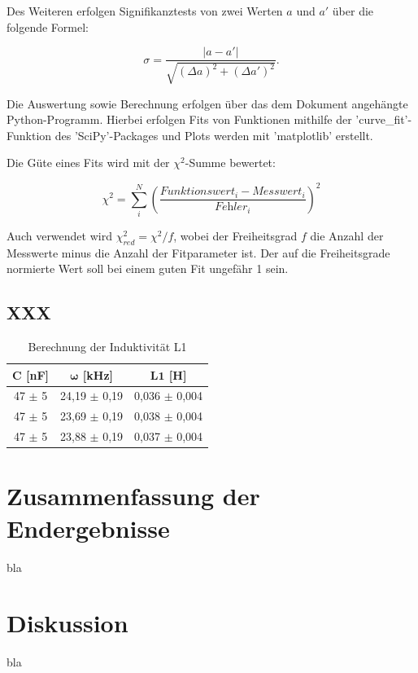 \documentclass{article}
\newcommand\invisiblesection[1]{%
  \refstepcounter{section}%
  \addcontentsline{toc}{section}{\protect\numberline{\thesection}#1}%
  \sectionmark{#1}\phantom{}}
\begin{document}
Des Weiteren erfolgen Signifikanztests von zwei Werten $a$ und $a'$ über die folgende Formel:

\begin{equation}
    \sigma = \frac{|a-a'|}{\sqrt{(\Delta a)^2 + (\Delta a')^2}}.
\end{equation}

Die Auswertung sowie Berechnung erfolgen über das dem Dokument angehängte Python-Programm. Hierbei erfolgen Fits von Funktionen mithilfe der 'curve\_fit'-Funktion des 'SciPy'-Packages und Plots werden mit 'matplotlib' erstellt.

Die Güte eines Fits wird mit der $\chi^2$-Summe bewertet:

\begin{equation}
    \chi^2 = \sum_i^N \left( \frac{\textit{Funktionswert}_i - \textit{Messwert}_i}{\textit{Fehler}_i} \right)^2
\end{equation}

Auch verwendet wird $\chi^2_{red} = \chi^2 / f$, wobei der Freiheitsgrad $f$ die Anzahl der Messwerte minus die Anzahl der Fitparameter ist. Der auf die Freiheitsgrade normierte Wert soll bei einem guten Fit ungefähr 1 sein.


\newpage

\subsection{XXX}

\begin{table}[!h]
    \centering
    \begin{tabular}{ccc}
        \hline
        $\bm{C}$ [nF] & $\bm{\omega}$ [kHz] & $\bm{L1}$ [H]  \\ \hline
         47 $\pm$ 5 & 24,19 $\pm$ 0,19 & 0,036 $\pm$ 0,004 \\
         47 $\pm$ 5 & 23,69 $\pm$ 0,19 & 0,038 $\pm$ 0,004 \\
         47 $\pm$ 5 & 23,88 $\pm$ 0,19 & 0,037 $\pm$ 0,004 \\ \hline
    \end{tabular}%
    \caption{Berechnung der Induktivität L1}
    \label{tab:A4-L1}
\end{table}

\clearpage
\newpage
\section{Zusammenfassung der Endergebnisse}

bla


\newpage
\section{Diskussion}

bla 

 
\newpage
%
%
\end{document}
